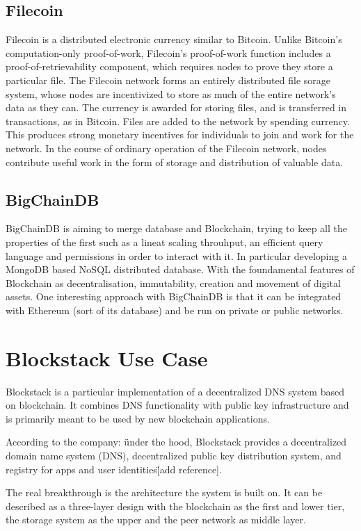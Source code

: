 \subsection*{Filecoin}
Filecoin is a distributed electronic currency similar to Bitcoin. Unlike Bitcoin’s computation-only proof-of-work, Filecoin’s proof-of-work function includes a proof-of-retrievability component, which requires nodes to prove they store a particular file. The Filecoin network forms an entirely distributed file sorage system, whose nodes are incentivized to store as much of the entire network’s data as they can. The currency is awarded for storing files, and is transferred in transactions, as in Bitcoin. Files are added to the network by spending currency. This produces strong monetary incentives for individuals to join and work for the network. In the course of ordinary operation of the Filecoin network, nodes contribute useful work in the form of storage and distribution of valuable data.

\subsection*{BigChainDB}
BigChainDB is aiming to merge database and Blockchain, trying to keep all the properties of the first such as a lineat scaling throuhput, an efficient query language and permissions in order to interact with it. In particular developing a MongoDB based NoSQL distributed database.
With the foundamental features of Blockchain as decentralisation, immutability, creation and movement of digital assets.
One interesting approach with BigChainDB is that it can be integrated with Ethereum (sort of its database) and be run on private or public networks.

\section{Blockstack Use Case}
Blockstack is a particular implementation of a decentralized DNS system based on blockchain. It combines DNS functionality with public key infrastructure and is primarily meant to be used by new blockchain applications.

According to the company: \"under the hood, Blockstack provides a decentralized domain name system (DNS), decentralized public key distribution system, and registry for apps and user identities\" [add reference].

The real breakthrough is the architecture the system is built on. It can be described as a three-layer design with the blockchain as the first and lower tier, the storage system as the upper and the peer network as middle layer.

